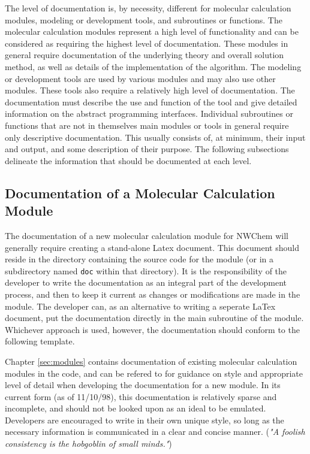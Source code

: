 The level of documentation is, by necessity, different for molecular
calculation modules,
modeling or development tools,
and subroutines or functions.
The molecular calculation modules represent a high level of functionality
and can be considered as requiring the highest level of documentation.
These modules in general require documentation of the underlying theory 
and overall solution
method, as well as details of the implementation of the algorithm.
The modeling or development tools are used by various modules and may also use
other modules.  These tools also require a relatively high level of documentation.
The documentation must describe the use and function of the
tool and give detailed information on the abstract programming interfaces.
Individual subroutines or functions that are not in themselves main modules or
tools in general require only descriptive documentation.  This usually consists
of, at  minimum, their input and output, and some
description of their purpose. 
The following subsections delineate the information that should be 
documented at each level.

\subsection{Documentation of a Molecular Calculation Module}
The documentation of a new molecular calculation module for NWChem will generally
require creating a stand-alone Latex document.  This document should reside
in the directory containing the source code for the module (or in a subdirectory
named {\tt doc} within that directory).  It is the responsibility of the
developer to write the documentation as an integral part of the development
process, and then to keep it current as changes or modifications are made
in the module.  The developer can, as an alternative to writing a seperate
LaTex document, put the documentation directly in the main subroutine of
the module.  Whichever approach is used, however, the documentation should
conform to the following template.

Chapter \ref{sec:modules} contains documentation of existing
molecular calculation modules in the code, and can be refered to for guidance
on style and appropriate level of detail when developing the documentation
for a new module.  In its current form (as of 11/10/98), this documentation is
relatively sparse and incomplete, and should not be looked upon as
an ideal to be emulated.  Developers are encouraged
to write in their own unique style, so long as the necessary information is
communicated in a clear and concise manner.  ({\em "A foolish consistency is 
the hobgoblin of small minds."})

